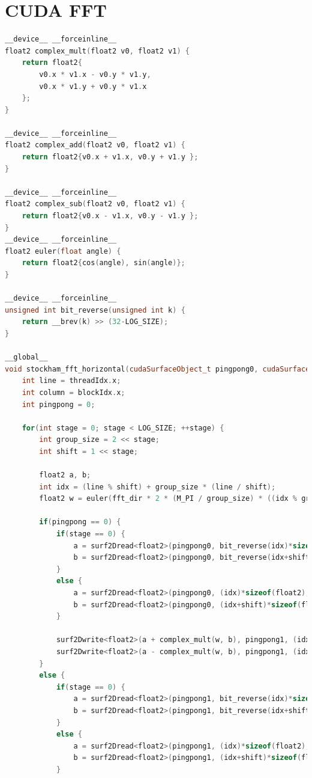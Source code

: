 \documentclass[
  oneside,
  11pt, a4paper,
  footinclude=true,
  headinclude=true,
  cleardoublepage=empty
]{scrbook}
\begin{document}
\chapter{CUDA FFT} \label{apdx:cuda-fft}

\begin{lstlisting}[language=C++,caption={FFT Radix-2 Cooley-Tukey, see \autoref{sec:implementation-analysis-in-cuda}},label={lst:cuda-radix2-ct}]
__device__ __forceinline__
float2 complex_mult(float2 v0, float2 v1) {
    return float2{
        v0.x * v1.x - v0.y * v1.y,
        v0.x * v1.y + v0.y * v1.x
    };
}

__device__ __forceinline__
float2 complex_add(float2 v0, float2 v1) {
    return float2{v0.x + v1.x, v0.y + v1.y };
}

__device__ __forceinline__
float2 complex_sub(float2 v0, float2 v1) {
    return float2{v0.x - v1.x, v0.y - v1.y };
}
__device__ __forceinline__
float2 euler(float angle) {
    return float2{cos(angle), sin(angle)};
}

__device__ __forceinline__
unsigned int bit_reverse(unsigned int k) {
    return __brev(k) >> (32-LOG_SIZE);
}

__global__
void stockham_fft_horizontal(cudaSurfaceObject_t pingpong0, cudaSurfaceObject_t pingpong1, float fft_dir) {
    int line = threadIdx.x;
    int column = blockIdx.x;
    int pingpong = 0;

    for(int stage = 0; stage < LOG_SIZE; ++stage) {
        int group_size = 2 << stage;
        int shift = 1 << stage;

        float2 a, b;
        int idx = (line % shift) + group_size * (line / shift);
        float2 w = euler(fft_dir * 2 * (M_PI / group_size) * ((idx % group_size) % shift));

        if(pingpong == 0) {
            if(stage == 0) {
                a = surf2Dread<float2>(pingpong0, bit_reverse(idx)*sizeof(float2), column);
                b = surf2Dread<float2>(pingpong0, bit_reverse(idx+shift)*sizeof(float2), column);
            }
            else {
                a = surf2Dread<float2>(pingpong0, (idx)*sizeof(float2), column);
                b = surf2Dread<float2>(pingpong0, (idx+shift)*sizeof(float2), column);
            }

            surf2Dwrite<float2>(a + complex_mult(w, b), pingpong1, (idx)*sizeof(float2), column);
            surf2Dwrite<float2>(a - complex_mult(w, b), pingpong1, (idx+shift)*sizeof(float2), column);
        }
        else {
            if(stage == 0) {
                a = surf2Dread<float2>(pingpong1, bit_reverse(idx)*sizeof(float2), column);
                b = surf2Dread<float2>(pingpong1, bit_reverse(idx+shift)*sizeof(float2), column);
            }
            else {
                a = surf2Dread<float2>(pingpong1, (idx)*sizeof(float2), column);
                b = surf2Dread<float2>(pingpong1, (idx+shift)*sizeof(float2), column);
            }


\end{lstlisting}
\end{document}
